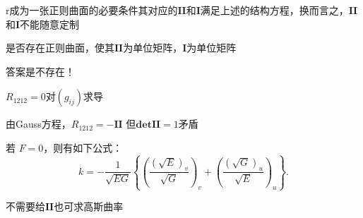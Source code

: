 \documentclass[lang=cn,10pt,thmcnt=section]{elegantbook}
\begin{document}
r成为一张正则曲面的必要条件其对应的$\mathbf{ II}$和$\mathbf{ I}$满足上述的结构方程，换而言之，$\mathbf{ II}$和$\mathbf{ I}$不能随意定制

\begin{example}
    是否存在正则曲面，使其$\mathbf{ II}$为单位矩阵，$\mathbf{ I}$为单位矩阵
\end{example}
答案是不存在！

$R_{1212}=0$对$(g_{ij})$求导

由Gauss方程，$R_{1212}=-\mathbf{ II}$
但$\mathbf{det II}=1$矛盾

\begin{proposition}
    若 $F=0$，则有如下公式：
\[
k = -\frac{1}{\sqrt{EG}}\left\{\left(\frac{(\sqrt{E})_v}{\sqrt{G}}\right)_v + \left(\frac{(\sqrt{G})_u}{\sqrt{E}}\right)_u\right\}.
\]
\end{proposition}
\begin{remark}
    不需要给$\mathbf{ II}$也可求高斯曲率
\end{remark}
\end{document}
